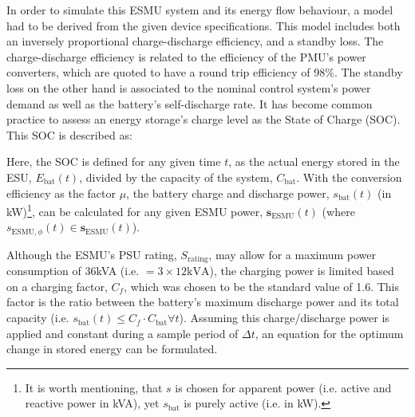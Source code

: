 In order to simulate this ESMU system and its energy flow behaviour, a model had to be derived from the given device specifications.
This model includes both an inversely proportional charge-discharge efficiency, and a standby loss.
The charge-discharge efficiency is related to the efficiency of the PMU's power converters, which are quoted to have a round trip efficiency of 98\%.
The standby loss on the other hand is associated to the nominal control system's power demand as well as the battery's self-discharge rate.
It has become common practice to assess an energy storage's charge level as the State of Charge (SOC).
This SOC is described as:



\nomenclature{$\eta$}{Round-trip efficiency of power electronics, where $\eta \in (0, 1]$ (Chapter \ref{ch1})}


Here, the SOC is defined for any given time $t$, as the actual energy stored in the ESU, $E_\text{bat}(t)$, divided by the capacity of the system, $C_\text{bat}$.
With the conversion efficiency as the factor $\mu$, the battery charge and discharge power, $s_\text{bat}(t)$ (in kW)\footnote[1]{It is worth mentioning, that $s$ is chosen for apparent power (i.e. active and reactive power in kVA), yet $s_\text{bat}$ is purely active (i.e. in kW).}, can be calculated for any given ESMU power, $\textbf{s}_\text{ESMU}(t)$ (where $s_{\text{ESMU},\phi}(t) \in \textbf{s}_\text{ESMU}(t)$).




Although the ESMU's PSU rating, $S_\text{rating}$, may allow for a maximum power consumption of 36kVA (i.e. $=3\times12\text{kVA}$), the charging power is limited based on a charging factor, $C_f$, which was chosen to be the standard value of 1.6.
This factor is the ratio between the battery's maximum discharge power and its total capacity (i.e. $s_\text{bat}(t) \leq C_f \cdot C_\text{bat} \forall t$).
Assuming this charge/discharge power is applied and constant during a sample period of $\Delta t$, an equation for the optimum change in stored energy can be formulated.

